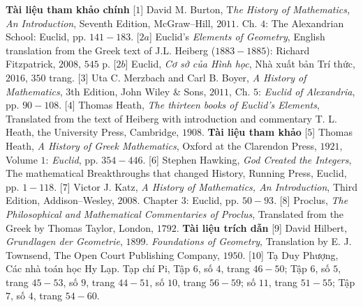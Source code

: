 \begin{multicols}{2}
	\vskip 0.1cm
	\textbf{\color{lichsutoanhoc}Tài liệu tham khảo chính}
	\vskip 0.1cm
	[$1$] David M. Burton, T\textit{he History of Mathematics, An Introduction}, Seventh Edition, McGraw--Hill, $2011$. Ch. $4$: The Alexandrian School: Euclid, pp. $141-183$.
	\vskip 0.1cm
	[$2a$] Euclid's \textit{Elements of Geometry}, English translation from the Greek text of J.L. Heiberg ($1883-1885$): Richard Fitzpatrick, $2008$, $545$ p.
	\vskip 0.1cm
	[$2b$] Euclid, \textit{Cơ sở của Hình học}, Nhà xuất bản Trí thức, $2016$, $350$ trang.
	\vskip 0.1cm
	[$3$] Uta C. Merzbach and Carl B. Boyer, \textit{A
	History of Mathematics}, $3$th Edition, John Wiley \& Sons, $2011$, Ch. $5$: \textit{Euclid of Alexandria}, pp. $90-108$.
	\vskip 0.1cm
	[$4$] Thomas Heath, \textit{The thirteen books of Euclid’s Elements}, Translated from the text of Heiberg with introduction and commentary T. L. Heath, the University Press, Cambridge, $1908$.
	\vskip 0.1cm   
	\textbf{\color{lichsutoanhoc}Tài liệu tham khảo}
	\vskip 0.1cm
	[$5$] Thomas Heath, \textit{A History of Greek Mathematics}, Oxford at the Clarendon Press, $1921$, Volume $1$: \textit{Euclid}, pp. $354-446$.
	\vskip 0.1cm   
	[$6$] Stephen Hawking, \textit{God Created the Integers}, The mathematical Breakthroughs that changed History, Running Press, Euclid, pp. $1-118$.   
	\vskip 0.1cm
	[$7$] Victor J. Katz, \textit{A History of Mathematics, An Introduction}, Third Edition, Addison--Wesley, $2008$. Chapter $3$: Euclid, pp. $50-93$.
	\vskip 0.1cm
	[$8$] Proclus, \textit{The Philosophical and Mathematical Commentaries of Proclus}, Translated from the Greek by Thomas Taylor, London, $1792$.
	\vskip 0.1cm
	\textbf{\color{lichsutoanhoc}Tài liệu trích dẫn}
	\vskip 0.1cm
	[$9$] David Hilbert, \textit{Grundlagen der Geometrie}, $1899$. \textit{Foundations of Geometry}, Translation by E. J. Townsend, The Open Court Publishing Company, $1950$.
	\vskip 0.1cm
	[$10$] Tạ Duy Phượng, Các nhà toán học Hy Lạp. Tạp chí Pi, Tập $6$, số $4$, trang $46-50$; Tập $6$, số $5$, trang $45-53$, số $9$, trang $44-51$, số $10$, trang $56-59$; số $11$, trang $51-55$; Tập $7$, số $4$, trang $54-60$.
\end{multicols}